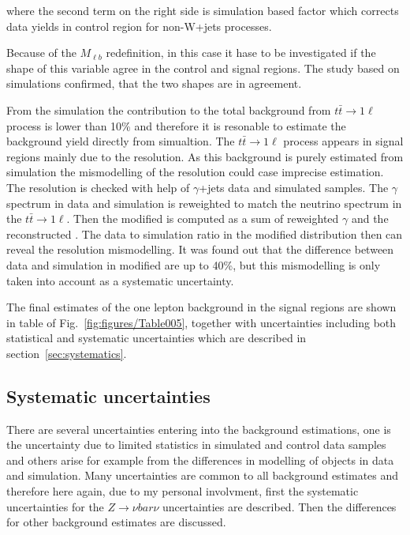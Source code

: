 where the second term on the right side is simulation based factor which corrects data yields in control region for non-W+jets processes.

Because of the $M_{\ell b}$ redefinition, in this case it hase to be investigated if the shape of this variable agree in the control and signal regions. The study based on simulations confirmed, that the two shapes are in agreement. 


From the simulation the contribution to the total background from $t\bar{t} \to 1\ell$ process is lower than 10\% and therefore it is resonable to estimate the background yield directly from simualtion. The $t\bar{t} \to 1\ell$ process appears in signal regions mainly due to the \MET resolution. As this background is purely estimated from simulation the mismodelling of the \MET resolution could case imprecise estimation. The \MET resolution is checked with help of $\gamma$+jets data and simulated samples. The $\gamma$ \pt spectrum in data and simulation is reweighted to match the neutrino \pt spectrum in the $t\bar{t} \to 1\ell$. Then the modified \MET is computed as a sum of reweighted $\gamma$ \pt and the reconstructed \MET. The data to simulation ratio in the modified \MET distribution then can reveal the \MET resolution mismodelling. It was found out that the difference between data and simulation in modified \MET are up to 40\%, but this mismodelling is only taken into account as a systematic uncertainty. %
 

The final estimates of the one lepton background in the signal regions are shown in table of Fig.~\ref{fig:figures/Table005}, together with uncertainties including both statistical and systematic uncertainties which are described in section~\ref{sec:systematics}.

\subsection{Systematic uncertainties~\label{sec:systematics}}

There are several uncertainties entering into the background estimations, one is the uncertainty due to limited statistics in simulated and control data samples and others arise for example from the differences in modelling of objects in data and simulation. Many uncertainties are common to all background estimates and therefore here again, due to my personal involvment, first the systematic uncertainties for the $Z \to \nu bar{\nu}$ uncertainties are described.  Then the differences for other background estimates are discussed.

